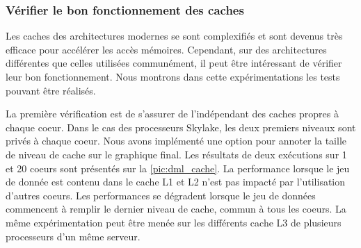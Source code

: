     
    
    

    \subsubsection{Vérifier le bon fonctionnement des caches}
        Les caches des architectures modernes se sont complexifiés et sont devenus très efficace pour accélérer les accès mémoires. Cependant, sur des architectures différentes que celles utilisées communément, il peut être intéressant de vérifier leur bon fonctionnement. Nous montrons dans cette expérimentations les tests pouvant être réalisés.
        
        La première vérification est de s'assurer de l'indépendant des caches propres à chaque coeur. Dans le cas des processeurs Skylake, les deux premiers niveaux sont privés à chaque coeur. Nous avons implémenté une option pour annoter la taille de niveau de cache sur le graphique final. Les résultats de deux exécutions sur 1 et 20 coeurs sont présentés sur la \autoref{pic:dml_cache}. La performance lorsque le jeu de donnée est contenu dans le cache L1 et L2 n'est pas impacté par l'utilisation d'autres coeurs. Les performances se dégradent lorsque le jeu de données commencent à remplir le dernier niveau de cache, commun à tous les coeurs. La même expérimentation peut être menée sur les différents cache L3 de plusieurs processeurs d'un même serveur.
        
